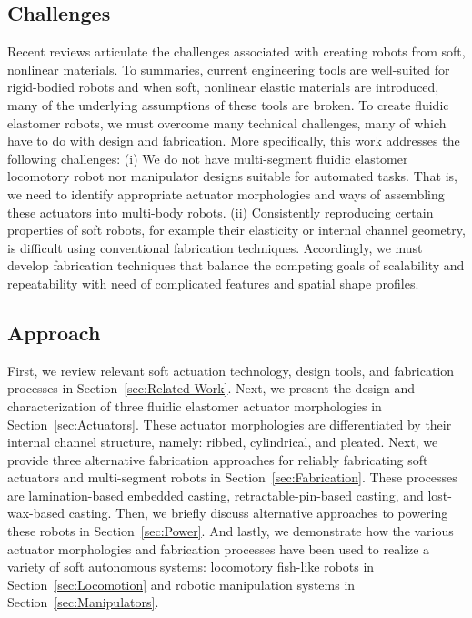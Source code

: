 \subsection{Challenges}
Recent reviews \citep{trivedi2008soft, trimmer2014journal, lipson2014challenges, majidi2014soft} articulate the challenges associated with creating robots from soft, nonlinear materials.
%
To summaries, current engineering tools are well-suited for rigid-bodied robots and when soft, nonlinear elastic materials are introduced, many of the underlying assumptions of these tools are broken.
%
To create fluidic elastomer robots, we must overcome many technical challenges, many of which have to do with design and fabrication.
%
More specifically, this work addresses the following challenges:
(i) We do not have multi-segment fluidic elastomer locomotory robot nor manipulator designs suitable for automated tasks.
That is, we need to identify appropriate actuator morphologies and ways of assembling these actuators into multi-body robots.
(ii) Consistently reproducing certain properties of soft robots, for example their elasticity or internal channel geometry, is difficult using conventional fabrication techniques.
Accordingly, we must develop fabrication techniques that balance the competing goals of scalability and repeatability with need of complicated features and spatial shape profiles.

\subsection{Approach}
First, we review relevant soft actuation technology, design tools, and fabrication processes in Section~\ref{sec:Related Work}.
%
Next, we present the design and characterization of three fluidic elastomer actuator morphologies in Section~\ref{sec:Actuators}.
%
These actuator morphologies are differentiated by their internal channel structure, namely: ribbed, cylindrical, and pleated.
%
Next, we provide three alternative fabrication approaches for reliably fabricating soft actuators and multi-segment robots in Section~\ref{sec:Fabrication}.
%
These processes are lamination-based embedded casting, retractable-pin-based casting, and lost-wax-based casting.
%
Then, we briefly discuss alternative approaches to powering these robots in Section~\ref{sec:Power}.
%
And lastly, we demonstrate how the various actuator morphologies and fabrication processes have been used to realize a variety of soft autonomous systems: locomotory fish-like robots in Section~\ref{sec:Locomotion} and robotic manipulation systems in Section~\ref{sec:Manipulators}.

